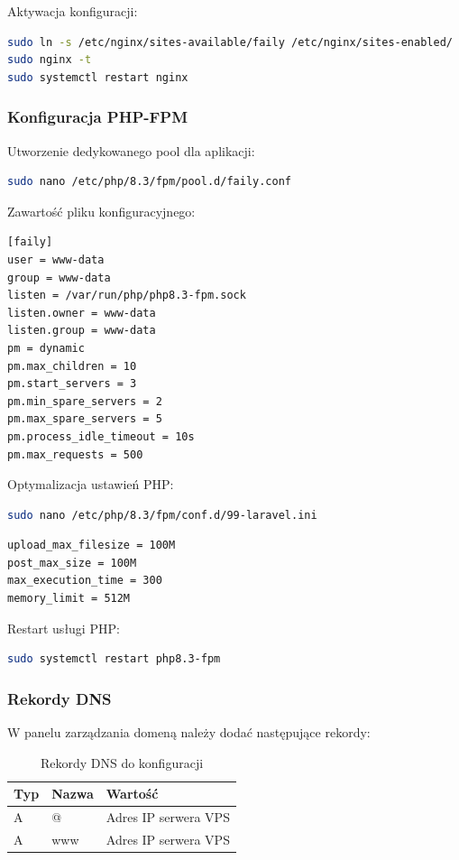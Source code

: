 \documentclass[12pt,a4paper]{article}
\begin{document}
Aktywacja konfiguracji:
\begin{lstlisting}[language=bash, caption=Aktywacja konfiguracji Nginx]
sudo ln -s /etc/nginx/sites-available/faily /etc/nginx/sites-enabled/
sudo nginx -t
sudo systemctl restart nginx
\end{lstlisting}

\subsubsection{Konfiguracja PHP-FPM}

Utworzenie dedykowanego pool dla aplikacji:
\begin{lstlisting}[language=bash, caption=Konfiguracja PHP-FPM pool]
sudo nano /etc/php/8.3/fpm/pool.d/faily.conf
\end{lstlisting}

Zawartość pliku konfiguracyjnego:
\begin{lstlisting}[caption=Konfiguracja pool PHP-FPM]
[faily]
user = www-data
group = www-data
listen = /var/run/php/php8.3-fpm.sock
listen.owner = www-data
listen.group = www-data
pm = dynamic
pm.max_children = 10
pm.start_servers = 3
pm.min_spare_servers = 2
pm.max_spare_servers = 5
pm.process_idle_timeout = 10s
pm.max_requests = 500
\end{lstlisting}

Optymalizacja ustawień PHP:
\begin{lstlisting}[language=bash, caption=Optymalizacja PHP]
sudo nano /etc/php/8.3/fpm/conf.d/99-laravel.ini
\end{lstlisting}

\begin{lstlisting}[caption=Ustawienia optymalizacji]
upload_max_filesize = 100M
post_max_size = 100M
max_execution_time = 300
memory_limit = 512M
\end{lstlisting}

Restart usługi PHP:
\begin{lstlisting}[language=bash]
sudo systemctl restart php8.3-fpm
\end{lstlisting}

\subsubsection{Rekordy DNS}
W panelu zarządzania domeną należy dodać następujące rekordy:

\begin{table}[H]
\centering
\begin{tabular}{@{}lll@{}}
\toprule
\textbf{Typ} & \textbf{Nazwa} & \textbf{Wartość} \\
\midrule
A & @ & Adres IP serwera VPS \\
A & www & Adres IP serwera VPS \\
\bottomrule
\end{tabular}
\caption{Rekordy DNS do konfiguracji}
\end{table}
\end{document}
